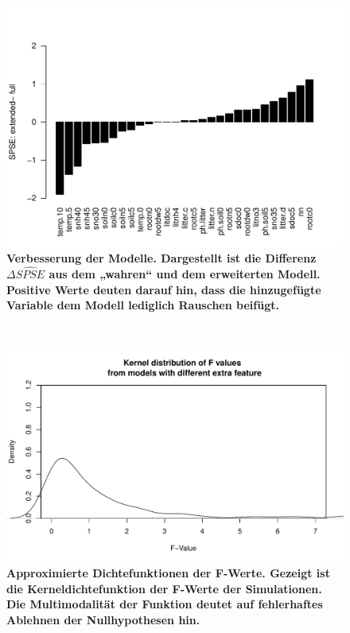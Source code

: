 \begin{figure}[htbp]
	\centering
	\includegraphics[width=\textwidth]{fig/simul/delta-spse.pdf}
	\caption{\bf{Verbesserung der Modelle.} 
		Dargestellt ist die Differenz $\Delta \widehat{SPSE}$ aus dem „wahren“ und dem erweiterten Modell.
		Positive Werte deuten darauf hin, dass die hinzugefügte Variable dem Modell lediglich Rauschen beifügt.
	}
	\label{fig-simul-delta-spse}
\end{figure}
\\
\begin{figure}[htbp]
	\centering
	\includegraphics[width=\textwidth]{fig/simul/kernel.pdf}
	\caption{\bf{Approximierte Dichtefunktionen der F-Werte.} 
		Gezeigt ist die Kerneldichtefunktion der F-Werte der Simulationen.
		Die Multimodalität der Funktion deutet auf fehlerhaftes Ablehnen der Nullhypothesen hin.
	}
	\label{fig-simul-kernel}
\end{figure}

